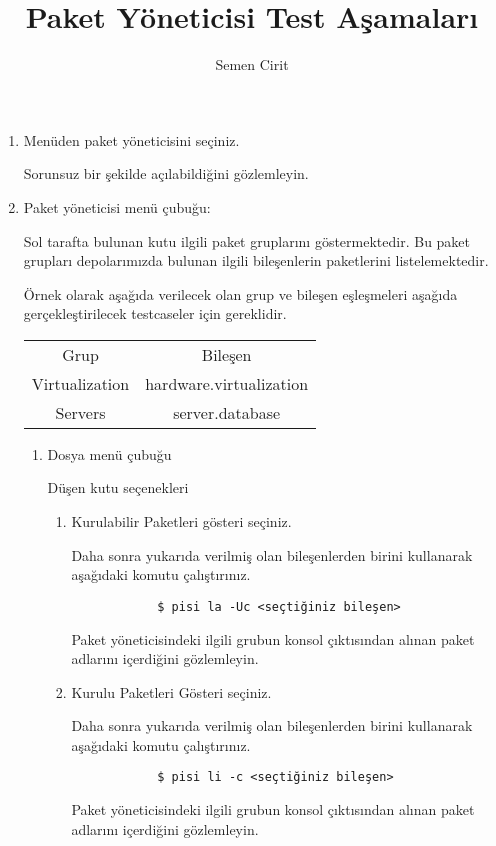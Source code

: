 \documentclass[a4paper,10pt]{article}
\title{Paket Yöneticisi Test Aşamaları}
\author{Semen Cirit}
\begin{document}
\maketitle

\begin{enumerate}
    \item Menüden paket yöneticisini seçiniz.
	
	  Sorunsuz bir şekilde açılabildiğini gözlemleyin.
 

    \item Paket yöneticisi menü çubuğu:

    Sol tarafta bulunan kutu ilgili paket gruplarını göstermektedir. Bu paket grupları depolarımızda bulunan ilgili bileşenlerin paketlerini listelemektedir.

    Örnek olarak aşağıda verilecek olan grup ve bileşen eşleşmeleri aşağıda gerçekleştirilecek testcaseler için gereklidir.
     \begin{table}[h]
	  \centering
	  \begin{tabular}{|c|c|}
		  \hline
		  Grup & Bileşen \\
		  Virtualization & hardware.virtualization \\
		  Servers & server.database \\
		  \hline
	  \end{tabular} 
	  \label{tab:tbl}
    \end{table}
    
    \begin{enumerate}
        \item Dosya menü çubuğu
    
        Düşen kutu seçenekleri
        \begin{enumerate}
            \item Kurulabilir Paketleri gösteri seçiniz.
            
	     Daha sonra yukarıda verilmiş olan bileşenlerden birini kullanarak aşağıdaki komutu çalıştırınız.
            \begin{verbatim}
            $ pisi la -Uc <seçtiğiniz bileşen>
            \end{verbatim}
            
	    Paket yöneticisindeki ilgili grubun konsol çıktısından alınan paket adlarını içerdiğini gözlemleyin.

            \item Kurulu Paketleri Gösteri seçiniz.

             Daha sonra yukarıda verilmiş olan bileşenlerden birini kullanarak aşağıdaki komutu çalıştırınız.
            \begin{verbatim}
            $ pisi li -c <seçtiğiniz bileşen>
            \end{verbatim}
            Paket yöneticisindeki ilgili grubun konsol çıktısından alınan paket adlarını içerdiğini gözlemleyin.
    

\end{enumerate}
\end{enumerate}
\end{enumerate}
\end{document}

